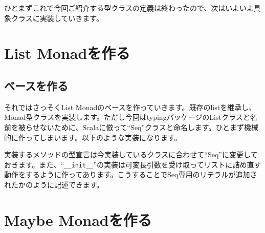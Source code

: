 ひとまずこれで今回ご紹介する型クラスの定義は終わったので、次はいよいよ具象クラスに実装していきます。

\section{List Monadを作る}
\subsection{ベースを作る}
それではさっそくList Monadのベースを作っていきます。既存のlistを継承し、Monad型クラスを実装します。ただし今回はtypingパッケージのListクラスと名前を被らせないために、Scalaに倣って``Seq''クラスと命名します。ひとまず機械的に作ってしまいます。以下のような実装になります。


実装するメソッドの型宣言は今実装しているクラスに合わせて``Seq''に変更しておきます。また、``\verb+__init__+''の実装は可変長引数を受け取ってリストに詰め直す動作をするように作ってあります。こうすることでSeq専用のリテラルが追加されたかのように記述できます。

\section{Maybe Monadを作る}
